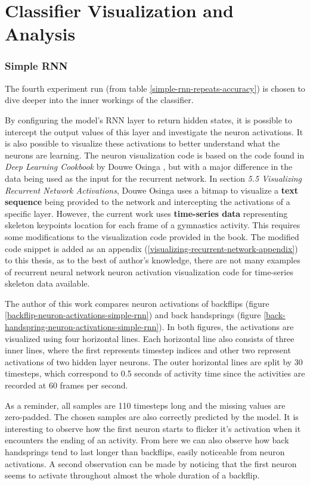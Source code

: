 \section{Classifier Visualization and Analysis}
\label{classifier-visualization}

\subsubsection{Simple RNN} 

The fourth experiment run (from table \ref{simple-rnn-repeats-accuracy}) is chosen to dive deeper into the inner workings of the classifier.

By configuring the model's RNN layer to return hidden states, it is possible to intercept the output values of this layer and investigate the neuron activations. It is also possible to visualize these activations to better understand what the neurons are learning. The neuron visualization code is based on the code found in \textit{Deep Learning Cookbook} by Douwe Osinga \cite{deep-learning-cookbook}, but with a major difference in the data being used as the input for the recurrent network. In section \textit{5.5 Visualizing Recurrent Network Activations}, Douwe Osinga uses a bitmap to visualize a \textbf{text sequence} being provided to the network and intercepting the activations of a specific layer. However, the current work uses \textbf{time-series data} representing skeleton keypoints location for each frame of a gymnastics activity. This requires some modifications to the visualization code provided in the book. The modified code snippet is added as an appendix (\ref{visualizing-recurrent-network-appendix}) to this thesis, as to the best of author's knowledge, there are not many examples of recurrent neural network neuron activation visualization code for time-series skeleton data available.

The author of this work compares neuron activations of backflips (figure \ref{backflip-neuron-activations-simple-rnn}) and back handsprings (figure \ref{back-handspring-neuron-activations-simple-rnn}). In both figures, the activations are visualized using four horizontal lines. Each horizontal line also consists of three inner lines, where the first represents timestep indices and other two represent activations of two hidden layer neurons. The outer horizontal lines are split by 30 timesteps, which correspond to 0.5 seconds of activity time since the activities are recorded at 60 frames per second.

As a reminder, all samples are 110 timesteps long and the missing values are zero-padded. The chosen samples are also correctly predicted by the model. It is interesting to observe how the first neuron starts to flicker it's activation when it encounters the ending of an activity. From here we can also observe how back handsprings tend to last longer than backflips, easily noticeable from neuron activations. A second observation can be made by noticing that the first neuron seems to activate throughout almost the whole duration of a backflip. 

